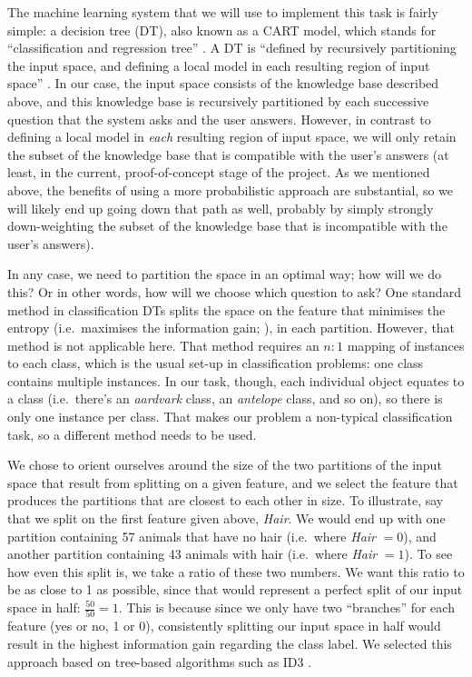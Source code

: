 \documentclass[11pt,a4paper]{article}
\begin{document}
The machine learning system that we will use to implement this task is fairly simple: a decision tree (DT), also known as a CART model, which stands for ``classification and regression tree'' \citep[Section 16.2]{Murphy2012}.
A DT is ``defined by recursively partitioning the input space, and defining a local model in each resulting region of input space'' \citep[545]{Murphy2012}.
In our case, the input space consists of the knowledge base described above, and this knowledge base is recursively partitioned by each successive question that the system asks and the user answers.
However, in contrast to defining a local model in \textit{each} resulting region of input space, we will only retain the subset of the knowledge base that is compatible with the user's answers (at least, in the current, proof-of-concept stage of the project.
As we mentioned above, the benefits of using a more probabilistic approach are substantial, so we will likely end up going down that path as well, probably by simply strongly down-weighting the subset of the knowledge base that is incompatible with the user's answers).

In any case, we need to partition the space in an optimal way; how will we do this? 
Or in other words, how will we choose which question to ask?
One standard method in classification DTs splits the space on the feature that minimises the entropy (i.e.\ maximises the information gain; \citealt{Quinlan1986}), in each partition.
However, that method is not applicable here.
That method requires an $n : 1$ mapping of instances to each class, which is the usual set-up in classification problems: one class contains multiple instances.
In our task, though, each individual object equates to a class (i.e.\ there's an \textit{aardvark} class, an \textit{antelope} class, and so on), so there is only one instance per class.
That makes our problem a non-typical classification task, so a different method needs to be used.

We chose to orient ourselves around the size of the two partitions of the input space that result from splitting on a given feature, and we select the feature that produces the partitions that are closest to each other in size.
To illustrate, say that we split on the first feature given above, \textit{Hair}.
We would end up with one partition containing 57 animals that have no hair (i.e.\ where \textit{Hair} $= 0$), and another partition containing 43 animals with hair (i.e.\ where \textit{Hair} $= 1$).
To see how even this split is, we take a ratio of these two numbers.
We want this ratio to be as close to 1 as possible, since that would represent a perfect split of our input space in half: $\frac{50}{50} = 1$.
This is because since we only have two ``branches'' for each feature (yes or no, 1 or 0), consistently splitting our input space in half would result in the highest information gain regarding the class label. 
We selected this approach based on tree-based algorithms such as ID3 \citep{Quinlan1986, Bishop2006}.
\end{document}
